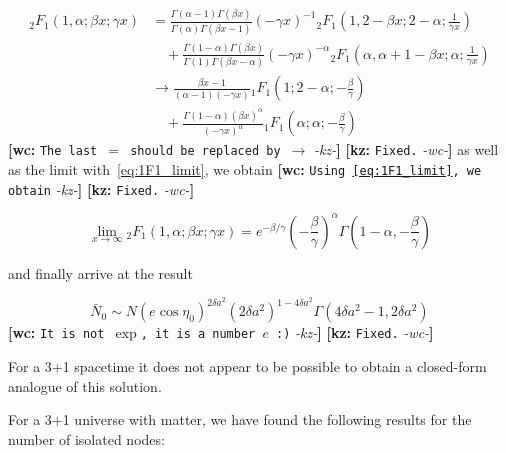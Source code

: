 \documentclass[preprint,notitlepage,amsmath,amssymb,floatfix]{revtex4-1}
\newcommand{\XXX}[3]{{\bf [#1: } {\tt #3} {\it -#2-}{\bf ]}}
\begin{document}
\begin{equation}
\begin{split}
{}_2F_1\left(1,\alpha;\beta x;\gamma x\right) &= \frac{\Gamma\left(\alpha-1\right)\Gamma\left(\beta x\right)}{\Gamma\left(\alpha\right)\Gamma\left(\beta x-1\right)}\left(-\gamma x\right)^{-1} {}_2F_1\left(1,2-\beta x;2-\alpha;\frac{1}{\gamma x}\right) \\
&\quad + \frac{\Gamma\left(1-\alpha\right)\Gamma\left(\beta x\right)}{\Gamma\left(1\right)\Gamma\left(\beta x-\alpha\right)}\left(-\gamma x\right)^{-\alpha} {}_2F_1\left(\alpha,\alpha+1-\beta x;\alpha;\frac{1}{\gamma x}\right) \\
&\rightarrow \frac{\beta x-1}{\left(\alpha-1\right)\left(-\gamma x\right)} {}_1F_1\left(1;2-\alpha;-\frac{\beta}{\gamma}\right) \\
&\quad + \frac{\Gamma\left(1-\alpha\right)\left(\beta x\right)^\alpha}{\left(-\gamma x\right)^\alpha} {}_1F_1\left(\alpha;\alpha;-\frac{\beta}{\gamma}\right)
\end{split}
\end{equation}
\XXX{wc}{kz}{The last $=$ should be replaced by $\rightarrow$} \XXX{kz}{wc}{Fixed.}
\noindent as well as the limit with~\eqref{eq:1F1_limit}, we obtain \XXX{wc}{kz}{Using~\eqref{eq:1F1_limit}, we obtain} \XXX{kz}{wc}{Fixed.}

\begin{equation}
\lim_{x\to\infty} {}_2F_1\left(1,\alpha;\beta x;\gamma x\right) = e^{-\beta/\gamma}\left(-\frac{\beta}{\gamma}\right)^\alpha\Gamma\left(1-\alpha,-\frac{\beta}{\gamma}\right)
\end{equation}

\noindent and finally arrive at the result

\begin{equation}
\bar{N}_0 \sim N\left(e\cos\eta_0\right)^{2\delta a^2}\left(2\delta a^2\right)^{1-4\delta a^2}\Gamma\left(4\delta a^2-1,2\delta a^2\right)
\end{equation}
\XXX{wc}{kz}{It is not $\exp$, it is a number $e$ :)} \XXX{kz}{wc}{Fixed.}

\noindent For a 3+1 spacetime it does not appear to be possible to obtain a closed-form analogue of this solution.  


\par For a 3+1 universe with matter, we have found the following results for the number of isolated nodes:
\end{document}

